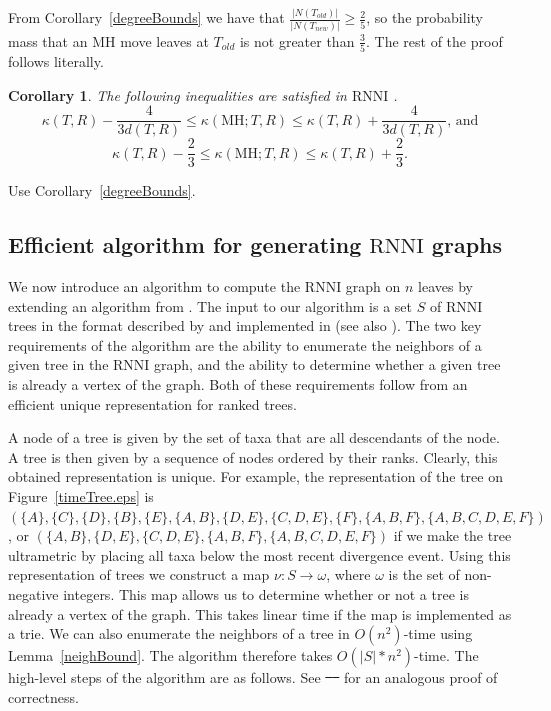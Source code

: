 \documentclass[11pt]{amsart}
\newtheorem{corollary}[lemma]{Corollary}
\theoremstyle{definition}
\newcommand{\rnni}{\mathrm{RNNI}}
\newcommand{\MH}{\mathrm{MH}}
\providecommand{\DIFdeltex}[1]{{\protect\color{red}\sout{#1}}}                      %
\providecommand{\DIFaddbegin}{} %
\providecommand{\DIFaddend}{} %
\providecommand{\DIFdelbegin}{} %
\providecommand{\DIFdelend}{} %
\providecommand{\DIFdel}[1]{\texorpdfstring{\DIFdeltex{#1}}{}} %
\begin{document}
{\proof
From Corollary~\ref{degreeBounds} we have that $\frac{|N(T_{old})|}{|N(T_{new})|} \geq \frac{2}{5}$, so the probability mass that an MH move leaves at $T_{old}$ is not greater than $\frac35$.
The rest of the proof follows \autocite[][Proof of Lemma~V.8]{Whidden2015-es} literally.
\endproof

\begin{corollary}
The following inequalities are satisfied in $\rnni$ .
\[
\kappa(T,R) - \dfrac{4}{3d(T,R)} \leq \kappa(\MH;T,R) \leq \kappa(T,R) +
\dfrac{4}{3d(T,R)}\mbox{, and}
\]
\[
\kappa(T,R) - \dfrac23 \leq \kappa(\MH;T,R) \leq \kappa(T,R) + \dfrac23.
\]
\end{corollary}

\proof
Use Corollary~\ref{degreeBounds}.
\endproof
}{}


\subsection{Efficient algorithm for generating $\rnni$ graphs}

We now introduce an algorithm to compute the $\rnni$ graph on $n$ leaves by extending an algorithm from \DIFdelbegin \DIFdel{\textcite{Whidden2015-es}}\DIFdelend \DIFaddbegin \autocite{Whidden2015-es}\DIFaddend .
The input to our algorithm is a set $S$ of $\rnni$ trees in the format described by \textcite{Gavryushkin2014-bw} and implemented in \autocite{tauGeodesic} (see also \autocite{Semple2003-nj}).
The two key requirements of the algorithm are the ability to enumerate the neighbors of a given tree in the $\rnni$ graph, and the ability to determine whether a given tree is already a vertex of the graph.
Both of these requirements follow from an efficient unique representation for ranked trees.

A node of a tree is given by the set of taxa that are all descendants of the node.
A tree is then given by a sequence of nodes ordered by their ranks.
Clearly, this obtained representation is unique.
For example, the representation of the tree on Figure~\ref{timeTree.eps} is $(\{A\}, \{C\}, \{D\}, \{B\}, \{E\}, \{A,B\}, \{D,E\}, \{C, D, E\}, \{F\}, \{A,B,F\}, \{A,B,C,D,E,F\})$, or
$(\{A,B\}, \{D,E\}, \{C, D, E\}, \{A,B,F\}, \{A,B,C,D,E,F\})$ if we make the tree ultrametric by placing all taxa below the most recent divergence event.
Using this representation of trees we construct a map $\nu : S \to \omega$, where $\omega$ is the set of non-negative integers.
This map allows us to determine whether or not a tree is already a vertex of the graph.
This takes linear time if the map is implemented as a trie.
We can also enumerate the neighbors of a tree in $O(n^2)$-time using Lemma~\ref{neighBound}.
The algorithm therefore takes $O(|S|*n^2)$-time.
The high-level steps of the algorithm are as follows.
See \DIFdelbegin \DIFdel{\mbox{%
\cite{Whidden2015-es} }%
}\DIFdelend \DIFaddbegin \autocite{Whidden2015-es} \DIFaddend for an analogous proof of correctness.
\end{document}
